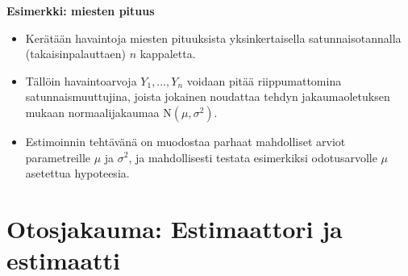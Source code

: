 \documentclass[
]{book}
\begin{document}
\begin{eblock}{}

\textbf{Esimerkki: miesten pituus}

\begin{itemize}
\item
  Kerätään havaintoja miesten pituuksista yksinkertaisella satunnaisotannalla (takaisinpalauttaen) \(n\) kappaletta.
\item
  Tällöin havaintoarvoja \(Y_1, \ldots, Y_n\) voidaan pitää riippumattomina satunnaismuuttujina, joista jokainen noudattaa tehdyn jakaumaoletuksen mukaan normaalijakaumaa \(\text{N}(\mu, \sigma^2)\).
\item
  Estimoinnin tehtävänä on muodostaa parhaat mahdolliset arviot parametreille \(\mu\) ja \(\sigma^2\), ja mahdollisesti testata esimerkiksi odotusarvolle \(\mu\) asetettua hypoteesia.
\end{itemize}

\end{eblock}

\hypertarget{alaluku62}{%
\section{Otosjakauma: Estimaattori ja estimaatti}\label{alaluku62}}
\end{document}
